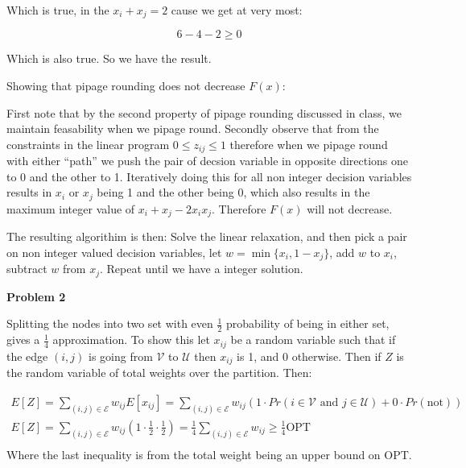 \documentclass{article}
\begin{document}
Which is true, in the $x_i + x_j = 2$ cause we get at very most:

$$6 - 4 - 2 \geq 0$$

Which is also true. So we have the result.

\vspace{3mm}

\noindent Showing that pipage rounding does not decrease $F(x)$:

\vspace{3mm}

\noindent First note that by the second property of pipage rounding discussed in class, we maintain feasability when we pipage round. 
Secondly observe that from the constraints in the linear program $0 \leq z_{ij} \leq 1$ therefore when we pipage round with either ``path'' we push the pair of decsion variable in opposite directions one to 0 and the other to 1. Iteratively doing this for all non integer decision variables results in $x_i$ or $x_j$ being 1 and the other being 0, which also results in the maximum integer value of $x_i + x_j - 2x_ix_j$. Therefore $F(x)$ will not decrease.

The resulting algorithim is then: Solve the linear relaxation, and then pick a pair on non integer valued decision variables, let $w = \min \{x_i, 1-x_j \}$, add $w$ to $x_i$, subtract $w$ from $x_j$. Repeat until we have a integer solution.

\newpage

\noindent\textbf{Problem 2}

Splitting the nodes into two set with even $\frac{1}{2}$ probability of being in either set, gives a $\frac{1}{4}$ approximation. To show this let $x_{ij}$ be a random variable such that if the edge $(i,j)$ is going from $\mathcal{V}$ to $\mathcal{U}$ then $x_{ij}$ is 1, and 0 otherwise. Then if $Z$ is the random variable of total weights over the partition. Then:

\begin{gather*}
  E[Z] = \sum_{(i,j)\in \mathcal{E}}w_{ij}E[x_{ij}] =  \sum_{(i,j)\in \mathcal{E}}w_{ij} (1 \cdot Pr(i \in \mathcal{V} \text{ and } j \in \mathcal{U}) + 0 \cdot Pr(\text{not}))\\
  E[Z] = \sum_{(i,j)\in \mathcal{E}}w_{ij}(1 \cdot \frac{1}{2} \cdot \frac{1}{2}) = \frac{1}{4} \sum_{(i,j)\in \mathcal{E}}w_{ij} \geq \frac{1}{4}\text{OPT}\\
\end{gather*}
Where the last inequality is from the total weight being an upper bound on OPT.
\end{document}
